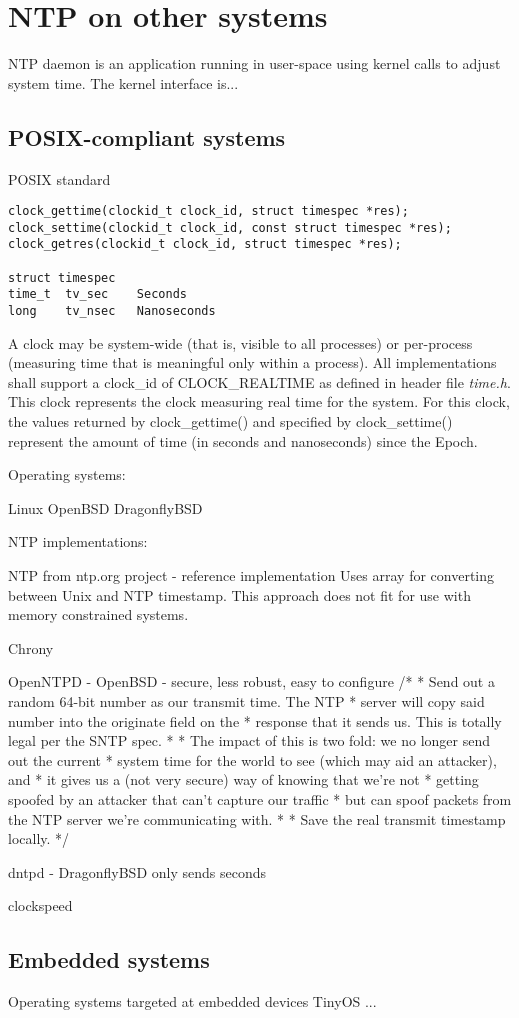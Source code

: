 
\chapter{NTP on other systems}

NTP daemon is an application running in user-space using kernel calls to adjust system time.
The kernel interface is...

\section{POSIX-compliant systems}\label{sec:posix}
POSIX standard
\begin{lstlisting}[morekeywords={clockid_t,time_t}]
clock_gettime(clockid_t clock_id, struct timespec *res);
clock_settime(clockid_t clock_id, const struct timespec *res);
clock_getres(clockid_t clock_id, struct timespec *res);

struct timespec
time_t  tv_sec    Seconds
long    tv_nsec   Nanoseconds
\end{lstlisting}
A clock may be system-wide (that is, visible to all processes)
or per-process (measuring time that is meaningful only within a process).
All implementations shall support a clock\_id of CLOCK\_REALTIME as
defined in header file {\it{time.h}}.
This clock represents the clock measuring real time for the system.
For this clock, the values returned by clock\_gettime() and specified
by clock\_settime() represent the amount
of time (in seconds and nanoseconds) since the Epoch.


Operating systems:

Linux
OpenBSD
DragonflyBSD

NTP implementations:

NTP from ntp.org project - reference implementation
Uses array for converting between Unix and NTP timestamp.
This approach does not fit for use with memory constrained systems.

Chrony

OpenNTPD - OpenBSD - secure, less robust, easy to configure
	/*
	 * Send out a random 64-bit number as our transmit time.  The NTP
	 * server will copy said number into the originate field on the
	 * response that it sends us.  This is totally legal per the SNTP spec.
	 *
	 * The impact of this is two fold: we no longer send out the current
	 * system time for the world to see (which may aid an attacker), and
	 * it gives us a (not very secure) way of knowing that we're not
	 * getting spoofed by an attacker that can't capture our traffic
	 * but can spoof packets from the NTP server we're communicating with.
	 *
	 * Save the real transmit timestamp locally.
	 */

dntpd - DragonflyBSD
only sends seconds


clockspeed

\section{Embedded systems}
Operating systems targeted at embedded devices
TinyOS
...
